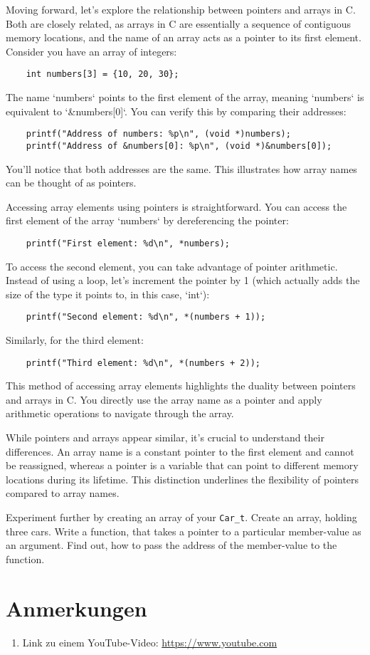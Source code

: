 \documentclass{dcbl/challenge}
\begin{document}
\begin{aufgabe}
    Moving forward, let's explore the relationship between pointers and arrays in C. Both are closely related, as arrays in C are essentially a sequence of contiguous memory locations, and the name of an array acts as a pointer to its first element.
    Consider you have an array of integers:
\begin{lstlisting}
    int numbers[3] = {10, 20, 30};
\end{lstlisting}
The name `numbers` points to the first element of the array, meaning `numbers` is equivalent to `\&numbers[0]`. You can verify this by comparing their addresses:
\begin{lstlisting}
    printf("Address of numbers: %p\n", (void *)numbers);
    printf("Address of &numbers[0]: %p\n", (void *)&numbers[0]);
\end{lstlisting}
You'll notice that both addresses are the same. This illustrates how array names can be thought of as pointers.

Accessing array elements using pointers is straightforward. You can access the first element of the array `numbers` by dereferencing the pointer:
\begin{lstlisting}
    printf("First element: %d\n", *numbers);
\end{lstlisting}
To access the second element, you can take advantage of pointer arithmetic. Instead of using a loop, let's increment the pointer by 1 (which actually adds the size of the type it points to, in this case, `int`):
\begin{lstlisting}
    printf("Second element: %d\n", *(numbers + 1));
\end{lstlisting}
Similarly, for the third element:
\begin{lstlisting}
    printf("Third element: %d\n", *(numbers + 2));
\end{lstlisting}
This method of accessing array elements highlights the duality between pointers and arrays in C. You directly use the array name as a pointer and apply arithmetic operations to navigate through the array.

While pointers and arrays appear similar, it's crucial to understand their differences. An array name is a constant pointer to the first element and cannot be reassigned, whereas a pointer is a variable that can point to different memory locations during its lifetime. This distinction underlines the flexibility of pointers compared to array names.

Experiment further by creating an array of your \texttt{Car\_t}. 
Create an array, holding three cars. 
Write a function, that takes a pointer to a particular member-value as an argument.
Find out, how to pass the address of the member-value to the function.

\end{aufgabe}

\section*{Anmerkungen}
\begin{enumerate}
    \item Link zu einem YouTube-Video: \url{https://www.youtube.com}
\end{enumerate}
\end{document}
